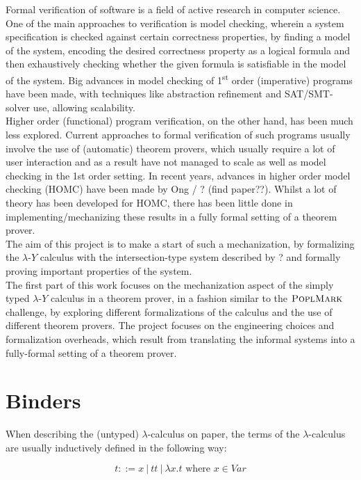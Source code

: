 \documentclass[a4paper, 12pt, twoside]{style/ociamthesis}
\newcommand{\lamy}{\lambda\text{-}Y}
\newcommand{\poplm}{\textsc{PoplMark}}
\begin{document}
Formal verification of software is a field of active research in
computer science. One of the main approaches to verification is model
checking, wherein a system specification is checked against certain
correctness properties, by finding a model of the system, encoding the
desired correctness property as a logical formula and then exhaustively
checking whether the given formula is satisfiable in the model of the
system. Big advances in model checking of 1\textsuperscript{st} order
(imperative) programs have been made, with techniques like abstraction
refinement and SAT/SMT-solver use, allowing scalability.\\
Higher order (functional) program verification, on the other hand, has
been much less explored. Current approaches to formal verification of
such programs usually involve the use of (automatic) theorem provers,
which usually require a lot of user interaction and as a result have not
managed to scale as well as model checking in the 1st order setting. In
recent years, advances in higher order model checking (HOMC) have been
made by Ong / ? (find paper??). Whilst a lot of theory has been
developed for HOMC, there has been little done in
implementing/mechanizing these results in a fully formal setting of a
theorem prover.\\
The aim of this project is to make a start of such a mechanization, by
formalizing the \(\lamy\) calculus with the intersection-type system
described by ? and formally proving important properties of the
system.\\
The first part of this work focuses on the mechanization aspect of the
simply typed \(\lamy\) calculus in a theorem prover, in a fashion
similar to the \(\poplm\) challenge, by exploring different
formalizations of the calculus and the use of different theorem provers.
The project focuses on the engineering choices and formalization
overheads, which result from translating the informal systems into a
fully-formal setting of a theorem prover.

\section{Binders}\label{binders}

When describing the (untyped) \(\lambda\)-calculus on paper, the terms
of the \(\lambda\)-calculus are usually inductively defined in the
following way:

\[t::= x\ |\ tt\ |\ \lambda x.t \text{ where }x \in Var\]
\end{document}
